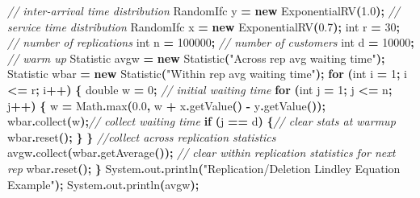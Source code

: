 \documentclass[
]{book}
\newenvironment{Shaded}{\begin{snugshade}}{\end{snugshade}}
\newcommand{\BuiltInTok}[1]{#1}
\newcommand{\CommentTok}[1]{\textcolor[rgb]{0.56,0.35,0.01}{\textit{#1}}}
\newcommand{\ControlFlowTok}[1]{\textcolor[rgb]{0.13,0.29,0.53}{\textbf{#1}}}
\newcommand{\DataTypeTok}[1]{\textcolor[rgb]{0.13,0.29,0.53}{#1}}
\newcommand{\DecValTok}[1]{\textcolor[rgb]{0.00,0.00,0.81}{#1}}
\newcommand{\FloatTok}[1]{\textcolor[rgb]{0.00,0.00,0.81}{#1}}
\newcommand{\FunctionTok}[1]{\textcolor[rgb]{0.00,0.00,0.00}{#1}}
\newcommand{\KeywordTok}[1]{\textcolor[rgb]{0.13,0.29,0.53}{\textbf{#1}}}
\newcommand{\NormalTok}[1]{#1}
\newcommand{\OperatorTok}[1]{\textcolor[rgb]{0.81,0.36,0.00}{\textbf{#1}}}
\newcommand{\StringTok}[1]{\textcolor[rgb]{0.31,0.60,0.02}{#1}}
\theoremstyle{definition}
\theoremstyle{definition}
\theoremstyle{definition}
\theoremstyle{definition}
\theoremstyle{remark}
\begin{document}
\begin{Shaded}
\begin{Highlighting}[]
\CommentTok{// inter{-}arrival time distribution}
\NormalTok{RandomIfc y }\OperatorTok{=} \KeywordTok{new} \FunctionTok{ExponentialRV}\OperatorTok{(}\FloatTok{1.0}\OperatorTok{);}
\CommentTok{// service time distribution}
\NormalTok{RandomIfc x }\OperatorTok{=} \KeywordTok{new} \FunctionTok{ExponentialRV}\OperatorTok{(}\FloatTok{0.7}\OperatorTok{);}
\DataTypeTok{int}\NormalTok{ r }\OperatorTok{=} \DecValTok{30}\OperatorTok{;} \CommentTok{// number of replications}
\DataTypeTok{int}\NormalTok{ n }\OperatorTok{=} \DecValTok{100000}\OperatorTok{;} \CommentTok{// number of customers}
\DataTypeTok{int}\NormalTok{ d }\OperatorTok{=} \DecValTok{10000}\OperatorTok{;} \CommentTok{// warm up}
\NormalTok{Statistic avgw }\OperatorTok{=} \KeywordTok{new} \FunctionTok{Statistic}\OperatorTok{(}\StringTok{"Across rep avg waiting time"}\OperatorTok{);}
\NormalTok{Statistic wbar }\OperatorTok{=} \KeywordTok{new} \FunctionTok{Statistic}\OperatorTok{(}\StringTok{"Within rep avg waiting time"}\OperatorTok{);}
\ControlFlowTok{for} \OperatorTok{(}\DataTypeTok{int}\NormalTok{ i }\OperatorTok{=} \DecValTok{1}\OperatorTok{;}\NormalTok{ i }\OperatorTok{\textless{}=}\NormalTok{ r}\OperatorTok{;}\NormalTok{ i}\OperatorTok{++)} \OperatorTok{\{}
    \DataTypeTok{double}\NormalTok{ w }\OperatorTok{=} \DecValTok{0}\OperatorTok{;} \CommentTok{// initial waiting time}
    \ControlFlowTok{for} \OperatorTok{(}\DataTypeTok{int}\NormalTok{ j }\OperatorTok{=} \DecValTok{1}\OperatorTok{;}\NormalTok{ j }\OperatorTok{\textless{}=}\NormalTok{ n}\OperatorTok{;}\NormalTok{ j}\OperatorTok{++)} \OperatorTok{\{}
\NormalTok{        w }\OperatorTok{=} \BuiltInTok{Math}\OperatorTok{.}\FunctionTok{max}\OperatorTok{(}\FloatTok{0.0}\OperatorTok{,}\NormalTok{ w }\OperatorTok{+}\NormalTok{ x}\OperatorTok{.}\FunctionTok{getValue}\OperatorTok{()} \OperatorTok{{-}}\NormalTok{ y}\OperatorTok{.}\FunctionTok{getValue}\OperatorTok{());}
\NormalTok{        wbar}\OperatorTok{.}\FunctionTok{collect}\OperatorTok{(}\NormalTok{w}\OperatorTok{);}\CommentTok{// collect waiting time}
        \ControlFlowTok{if} \OperatorTok{(}\NormalTok{j }\OperatorTok{==}\NormalTok{ d}\OperatorTok{)} \OperatorTok{\{}\CommentTok{// clear stats at warmup}
\NormalTok{            wbar}\OperatorTok{.}\FunctionTok{reset}\OperatorTok{();}
        \OperatorTok{\}}
    \OperatorTok{\}}
    \CommentTok{//collect across replication statistics}
\NormalTok{    avgw}\OperatorTok{.}\FunctionTok{collect}\OperatorTok{(}\NormalTok{wbar}\OperatorTok{.}\FunctionTok{getAverage}\OperatorTok{());}
    \CommentTok{// clear within replication statistics for next rep}
\NormalTok{    wbar}\OperatorTok{.}\FunctionTok{reset}\OperatorTok{();}
\OperatorTok{\}}
\BuiltInTok{System}\OperatorTok{.}\FunctionTok{out}\OperatorTok{.}\FunctionTok{println}\OperatorTok{(}\StringTok{"Replication/Deletion Lindley Equation Example"}\OperatorTok{);}
\BuiltInTok{System}\OperatorTok{.}\FunctionTok{out}\OperatorTok{.}\FunctionTok{println}\OperatorTok{(}\NormalTok{avgw}\OperatorTok{);}
\end{Highlighting}
\end{Shaded}
\end{document}
